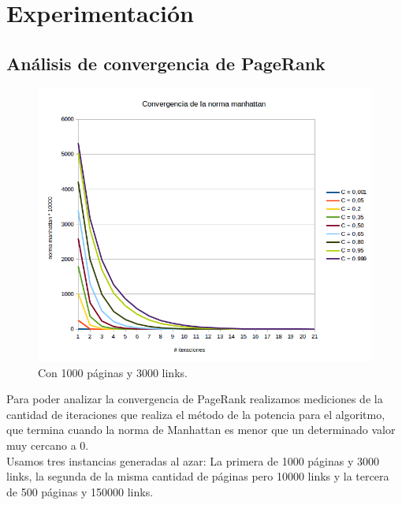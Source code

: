 \section{Experimentación}

\subsection{Análisis de convergencia de PageRank}
\begin{figure}
  \vspace{-20pt}
  \begin{center}
    \includegraphics[scale= 0.6]{imagenes/convergencia1.png}
  \end{center}
  \vspace{-20pt}
   \caption{Con  1000 páginas y 3000 links.}
  \vspace{-10pt}
  \label{fig:img1}
\end{figure}

Para poder analizar la convergencia de PageRank realizamos mediciones de la cantidad de iteraciones que realiza el método de la potencia para el algoritmo, que termina cuando la norma de Manhattan es menor que un determinado valor muy cercano a 0.\\

Usamos tres instancias generadas al azar: La primera de 1000 páginas y 3000 links, la segunda de la misma cantidad de páginas pero 10000 links y la tercera de 500 páginas y 150000 links.\\

